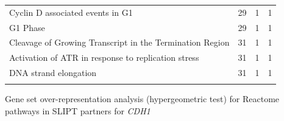 \begin{table}[!ht]
{\begin{threeparttable}
\begin{tabular}{lccc}
  \rowcolor{black!5}
  Cyclin D associated events in G1 &  29 &   1 &   1 \\ 
  \rowcolor{black!10}
  G1 Phase &  29 &   1 &   1 \\ 
  \rowcolor{black!5}
  Cleavage of Growing Transcript in the Termination Region &  31 &   1 &   1 \\ 
  \rowcolor{black!10}
  Activation of ATR in response to replication stress &  31 &   1 &   1 \\ 
  \rowcolor{black!5}
  DNA strand elongation &  31 &   1 &   1 \\ 
  \rowcolor{black!10}
  \hline
\end{tabular}
\begin{tablenotes}
\raggedright \small
Gene set over-representation analysis (hypergeometric test) for Reactome pathways in SLIPT partners for \textit{CDH1}
\end{tablenotes}
\end{threeparttable}
}
\end{table}



\FloatBarrier
